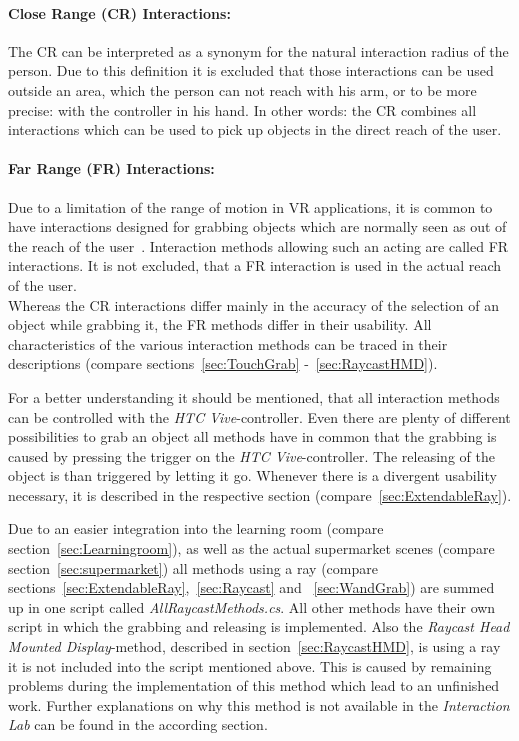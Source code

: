 \paragraph{Close Range (CR) Interactions:} The CR can be interpreted as a synonym for the natural interaction radius of the person. Due to this definition it is excluded that those interactions can be used outside an area, which the person can not reach with his arm, or to be more precise: with the controller in his hand. In other words: the CR combines all interactions which can be used to pick up objects in the direct reach of the user.

\paragraph{Far Range (FR) Interactions:} Due to a limitation of the range of motion in VR applications, it is common to have interactions designed for grabbing objects which are normally seen as out of the reach of the user~\cite{VRBook}. Interaction methods allowing such an acting are called FR interactions. It is not excluded, that a FR interaction is used in the actual reach of the user. \\

Whereas the CR interactions differ mainly in the accuracy of the selection of an object while grabbing it, the FR methods differ in their usability. All characteristics of the various interaction methods can be traced in their descriptions (compare sections~\ref{sec:TouchGrab} -~\ref{sec:RaycastHMD}).

For a better understanding it should be mentioned, that all interaction methods can be controlled with the \textit{HTC Vive}-controller. Even there are plenty of different possibilities to grab an object all methods have in common that the grabbing is caused by pressing the trigger on the \textit{HTC Vive}-controller. The releasing of the object is than triggered by letting it go. Whenever there is a divergent usability necessary, it is described in the respective section (compare~\ref{sec:ExtendableRay}).

Due to an easier integration into the learning room (compare section~\ref{sec:Learningroom}), as well as the actual supermarket scenes (compare section~\ref{sec:supermarket}) all methods using a ray (compare sections~\ref{sec:ExtendableRay},~\ref{sec:Raycast} and ~\ref{sec:WandGrab}) are summed up in one script called \textit{AllRaycastMethods.cs}. All other methods have their own script in which the grabbing and releasing is implemented. Also the \textit{Raycast Head Mounted Display}-method, described in section~\ref{sec:RaycastHMD}, is using a ray it is not included into the script mentioned above. This is caused by remaining problems during the implementation of this method which lead to an unfinished work. Further explanations on why this method is not available in the \textit{Interaction Lab} can be found in the according section.

